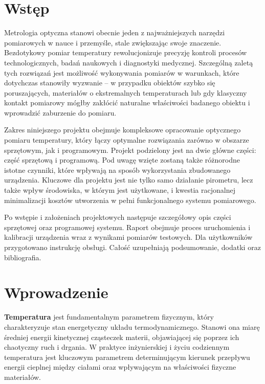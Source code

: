 \chapter{Wstęp}

Metrologia optyczna stanowi obecnie jeden z najważniejszych narzędzi pomiarowych w nauce i przemyśle, stale zwiększając swoje znaczenie. Bezdotykowy pomiar temperatury rewolucjonizuje precyzję kontroli procesów technologicznych, badań naukowych i diagnostyki medycznej. Szczególną zaletą tych rozwiązań jest możliwość wykonywania pomiarów w warunkach, które dotychczas stanowiły wyzwanie – w przypadku obiektów szybko się poruszających, materiałów o ekstremalnych temperaturach lub gdy klasyczny kontakt pomiarowy mógłby zakłócić naturalne właściwości badanego obiektu i wprowadzić zaburzenie do pomiaru.

\vspace{12pt}

Zakres niniejszego projektu obejmuje kompleksowe opracowanie optycznego pomiaru temperatury, który łączy optymalne rozwiązania zarówno w obszarze sprzętowym, jak i programowym. Projekt podzielony jest na dwie główne części: część sprzętową i programową. Pod uwagę wzięte zostaną także różnorodne istotne czynniki, które wpływają na sposób wykorzystania zbudowanego urządzenia. Kluczowe dla projektu jest nie tylko samo działanie pirometru, lecz także wpływ środowiska, w którym jest użytkowane, i kwestia racjonalnej minimalizacji kosztów utworzenia w pełni funkcjonalnego systemu pomiarowego.

\vspace{12pt}

Po wstępie i założeniach projektowych następuje szczegółowy opis części sprzętowej oraz programowej systemu. Raport obejmuje proces uruchomienia i kalibracji urządzenia wraz z wynikami pomiarów testowych. Dla użytkowników przygotowano instrukcję obsługi. Całość uzupełniają podsumowanie, dodatki oraz bibliografia.

\chapter{Wprowadzenie}



\textbf{Temperatura} jest fundamentalnym parametrem fizycznym, który charakteryzuje stan energetyczny układu termodynamicznego. Stanowi ona miarę średniej energii kinetycznej cząsteczek materii, objawiającej się poprzez ich chaotyczny ruch i drgania. W praktyce inżynierskiej i życiu codziennym temperatura jest kluczowym parametrem determinującym kierunek przepływu energii cieplnej między ciałami oraz wpływającym na właściwości fizyczne materiałów.


